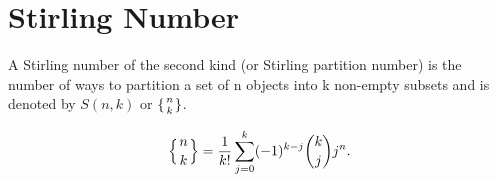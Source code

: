 \section{Stirling Number}
A Stirling number of the second kind (or Stirling partition number) is the number of ways to partition a set of n objects into k non-empty subsets and is denoted by $S(n,k)$ or  $\lbrace{n\atop k}\rbrace$.

$$
\left\{ {n \atop k}\right\} = \frac{1}{k!}\sum_{j=0}^{k} (-1)^{k-j} \binom{k}{j} j^n.
$$
